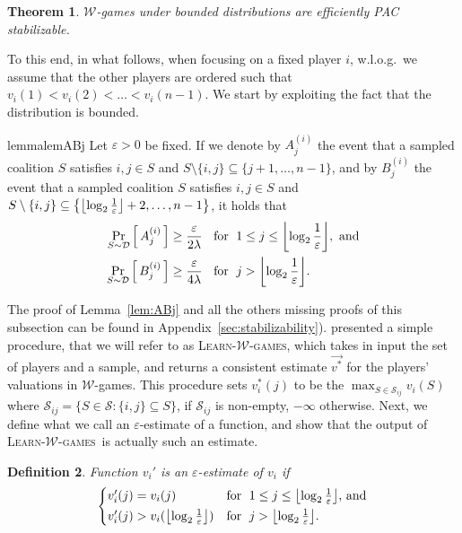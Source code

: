 \documentclass[letterpaper]{article} %
\newtheorem{theorem}{Theorem}[section]
\newtheorem{definition}[theorem]{Definition}
\DeclarePairedDelimiter{\floor}{\lfloor}{\rfloor}
\let\eps\varepsilon
\newcommand{\distribution}{\mathcal{D}}
\newcommand{\set}[1]{\{#1\}}
\newcommand{\Prob}[2]{\Pr_{#2}\left[\,#1\,\right]}
\newcommand{\Wthreshold}{\ensuremath{\floor*{\log_2{\frac{1}{\varepsilon}}}}}
\newcommand{\W}{\ensuremath{\mathcal{W}}}
\newcommand{\learnWGames}{\textsc{Learn-}\W\textsc{-games}}
\begin{document}
\begin{theorem}\label{thm:WgamesBoundedDistributions}
$\W$-games under bounded distributions are efficiently PAC stabilizable.
\end{theorem}

To this end, in what follows, when focusing on a fixed player $i$, w.l.o.g.\ we assume that the other players are ordered such that $v_i(1) < v_i(2) < \ldots < v_i(n-1)$. We start by exploiting the fact that the distribution is bounded.

\begin{restatable}{lemma}{lemABj}\label{lem:ABj}
Let $\eps>0$ be fixed. If we denote by $A^{(i)}_j$ the event that a sampled coalition $S$ satisfies $i,j \in S$ and $S\setminus \{i, j\} \subseteq \{j+1, \ldots, n-1\}$, and by $B^{(i)}_j$ the event that a sampled coalition $S$ satisfies $i,j \in S$ and $S\setminus \{i,j\} \subseteq \left\{\Wthreshold+2, \ldots, n-1\right\}$, it holds that 
\begin{align*}
 \Prob{A^{(i)}_j}{S\sim \distribution} \geq \frac{\eps}{2 \lambda} &\; \text{\; for \;} 1 \leq j \leq \Wthreshold, \text{ and}\\
 \Prob{B^{(i)}_j}{S\sim \distribution} \geq \frac{\eps}{4 \lambda} &\; \text{\; for \;} j > \Wthreshold.
\end{align*}
\end{restatable}
%
The proof of Lemma~\ref{lem:ABj} and all the others missing proofs of this subsection can be found in Appendix~\ref{sec:stabilizability}).
%
\citet{SliwinskiZ17} presented a simple procedure, that we will refer to as \learnWGames, which takes in input the set of players and a sample, and returns a consistent estimate $\vec{v^*}$ for the players' valuations in $\W$-games. This procedure sets $v^*_{i}(j)$ to be the $\max_{S \in \mathcal{S}_{ij}} v_i(S)$ where $\mathcal{S}_{ij} = \set{S\in \mathcal{S}: \set{i,j} \subseteq S}$, if $\mathcal{S}_{ij}$ is non-empty, $-\infty$ otherwise.
%
Next, we define what we call an $\eps$-estimate of a function, and show that the output of \learnWGames\ is actually such an estimate.

\begin{definition}
Function $v_i'$ is an $\eps$-\emph{estimate} of $v_i$ if
\begin{equation}
\begin{cases*}
v_i'(j) = v_i(j) & for \;$1 \leq j \leq \Wthreshold$, and\\
v_i'(j) > v_i(\Wthreshold) & for \;$j > \Wthreshold$.\\
\end{cases*}
\end{equation}
\end{definition}
\end{document}
